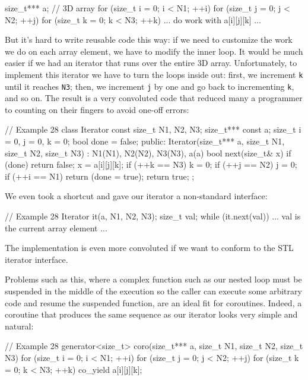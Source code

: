 \begin{code}
size_t*** a; // 3D array
for (size_t i = 0; i < N1; ++i) {
  for (size_t j = 0; j < N2; ++j) {
    for (size_t k = 0; k < N3; ++k) {
      ... do work with a[i][j][k] ...
    }
  }
}
\end{code}

But it's hard to write reusable code this way: if we need to customize the work we do on each array element, we have to modify the inner loop. It would be much easier if we had an iterator that runs over the entire 3D array. Unfortunately, to implement this iterator we have to turn the loops inside out: first, we increment \texttt{k} until it reaches \texttt{N3}; then, we increment \texttt{j} by one and go back to incrementing \texttt{k}, and so on. The result is a very convoluted code that reduced many a programmer to counting on their fingers to avoid one-off errors:

\begin{code}
// Example 28
class Iterator {
  const size_t N1, N2, N3;
  size_t*** const a;
  size_t i = 0, j = 0, k = 0;
  bool done = false;
  public:
  Iterator(size_t*** a, size_t N1, size_t N2, size_t N3) :
    N1(N1), N2(N2), N3(N3), a(a) {}
  bool next(size_t& x) {
    if (done) return false;
    x = a[i][j][k];
    if (++k == N3) {
      k = 0;
      if (++j == N2) {
        j = 0;
        if (++i == N1) return (done = true);
      }
    }
    return true;
  }
};
\end{code}

We even took a shortcut and gave our iterator a non-standard interface:

\begin{code}
// Example 28
Iterator it(a, N1, N2, N3);
size_t val;
while (it.next(val)) {
  ... val is the current array element ...
}
\end{code}

The implementation is even more convoluted if we want to conform to the STL iterator interface.

Problems such as this, where a complex function such as our nested loop must be suspended in the middle of the execution so the caller can execute some arbitrary code and resume the suspended function, are an ideal fit for coroutines. Indeed, a coroutine that produces the same sequence as our iterator looks very simple and natural:

\begin{code}
// Example 28
generator<size_t>
coro(size_t*** a, size_t N1, size_t N2, size_t N3) {
  for (size_t i = 0; i < N1; ++i) {
    for (size_t j = 0; j < N2; ++j) {
      for (size_t k = 0; k < N3; ++k) {
        co_yield a[i][j][k];
      }
    }
  }
}
\end{code}

